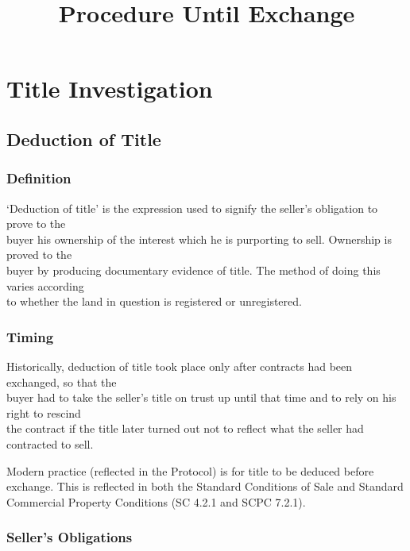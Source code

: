 \documentclass[
]{article}
\title{Procedure Until Exchange}
\author{}
\date{}
\begin{document}
\maketitle

{
\setcounter{tocdepth}{3}
\tableofcontents
}
\hypertarget{title-investigation}{%
\section{Title Investigation}\label{title-investigation}}

\hypertarget{deduction-of-title}{%
\subsection{Deduction of Title}\label{deduction-of-title}}

\hypertarget{definition}{%
\subsubsection{Definition}\label{definition}}

`Deduction of title' is the expression used to signify the seller's
obligation to prove to the\\
buyer his ownership of the interest which he is purporting to sell.
Ownership is proved to the\\
buyer by producing documentary evidence of title. The method of doing
this varies according\\
to whether the land in question is registered or unregistered.

\hypertarget{timing}{%
\subsubsection{Timing}\label{timing}}

Historically, deduction of title took place only after contracts had
been exchanged, so that the\\
buyer had to take the seller's title on trust up until that time and to
rely on his right to rescind\\
the contract if the title later turned out not to reflect what the
seller had contracted to sell.

Modern practice (reflected in the Protocol) is for title to be deduced
before exchange. This is reflected in both the Standard Conditions of
Sale and Standard Commercial Property Conditions (SC 4.2.1 and SCPC
7.2.1).

\hypertarget{sellers-obligations}{%
\subsubsection{Seller's Obligations}\label{sellers-obligations}}
\end{document}
